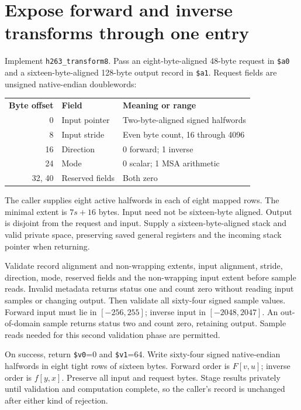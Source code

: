 \section{Expose forward and inverse transforms through one entry}
Implement \texttt{h263\_transform8}. Pass an eight-byte-aligned 48-byte request
in \texttt{\$a0} and a sixteen-byte-aligned 128-byte output record in
\texttt{\$a1}. Request fields are unsigned native-endian doublewords:
\begin{center}
  \begin{tabular}{rll}
    \textbf{Byte offset} & \textbf{Field}  & \textbf{Meaning or range}         \\
    0                    & Input pointer   & Two-byte-aligned signed halfwords \\
    8                    & Input stride    & Even byte count, 16 through 4096  \\
    16                   & Direction       & 0 forward; 1 inverse              \\
    24                   & Mode            & 0 scalar; 1 MSA arithmetic        \\
    32, 40               & Reserved fields & Both zero
  \end{tabular}
\end{center}
The caller supplies eight active halfwords in each of eight mapped rows. The
minimal extent is $7s+16$ bytes. Input need not be sixteen-byte aligned. Output
is disjoint from the request and input. Supply a sixteen-byte-aligned stack and
valid private space, preserving saved general registers and the incoming stack
pointer when returning.

Validate record alignment and non-wrapping extents, input alignment, stride,
direction, mode, reserved fields and the non-wrapping input extent before sample
reads. Invalid metadata returns status one and count zero without reading input
samples or changing output. Then validate all sixty-four signed sample values.
Forward input must lie in $[-256,255]$; inverse input in $[-2048,2047]$.
An out-of-domain sample returns status two and count zero, retaining output.
Sample reads needed for this second validation phase are permitted.

On success, return \texttt{\$v0}=0 and \texttt{\$v1}=64. Write sixty-four signed
native-endian halfwords in eight tight rows of sixteen bytes. Forward order is
$F[v,u]$; inverse order is $f[y,x]$. Preserve all input and request bytes. Stage
results privately until validation and computation complete, so the caller's
record is unchanged after either kind of rejection.

